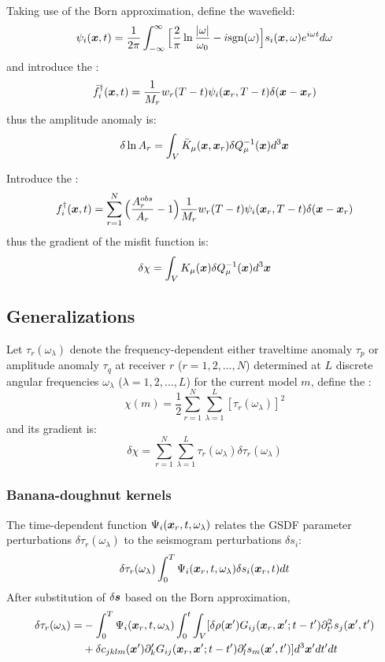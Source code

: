 Taking use of the Born approximation, define the wavefield:
\[ \psi_i(\boldsymbol{x},t)=\frac{1}{2\pi}\int_{-\infty}^\infty\Big[\frac{2}{\pi}\ln\frac{|\omega|}{\omega_0}-i\text{sgn}(\omega)\Big]s_i(\boldsymbol{x},\omega)e^{i\omega t}d\omega \]
and introduce the :
\[ \bar f_i^\dagger(\boldsymbol{x},t)=\frac{1}{M_r}w_r(T-t)\psi_i(\boldsymbol{x}_r,T-t)\delta(\boldsymbol{x}-\boldsymbol{x}_r) \]
thus the amplitude anomaly is:
\[ \delta\ln A_r=\int_V\bar K_\mu(\boldsymbol{x},\boldsymbol{x}_r)\delta Q_\mu^{-1}(\boldsymbol{x})d^3\boldsymbol{x} \]

Introduce the :
\[ f_i^\dagger(\boldsymbol{x},t)=\sum_{r=1}^N\Big(\frac{A_r^{obs}}{A_r}-1\Big)\frac{1}{M_r}w_r(T-t)\psi_i(\boldsymbol{x}_r,T-t)\delta(\boldsymbol{x}-\boldsymbol{x}_r) \]
thus the gradient of the  misfit function is:
\[ \delta\chi=\int_VK_\mu(\boldsymbol{x})\delta Q_\mu^{-1}(\boldsymbol{x})d^3\boldsymbol{x} \]

\subsection{Generalizations}
Let $\tau_r(\omega_\lambda)$ denote the frequency-dependent
either traveltime anomaly $\tau_p$ or amplitude anomaly $\tau_q$ at receiver $r$ ($r=1,2,\ldots,N$)
determined at $L$ discrete angular frequencies $\omega_\lambda$ ($\lambda=1,2,\ldots,L$)
for the current model $m$, define the :
\[ \chi(m)=\frac{1}{2}\sum_{r=1}^N\sum_{\lambda=1}^L[\tau_r(\omega_\lambda)]^2 \]
and its gradient is:
\[ \delta\chi=\sum_{r=1}^N\sum_{\lambda=1}^L\tau_r(\omega_\lambda)\delta\tau_r(\omega_\lambda) \]

\subsubsection{Banana-doughnut kernels}
The time-dependent function $\Psi_i(\boldsymbol{x}_r,t,\omega_\lambda)$
relates the GSDF parameter perturbations $\delta\tau_r(\omega_\lambda)$
to the seismogram perturbations $\delta s_i$:
\[ \delta\tau_r(\omega_\lambda)\int_0^T\Psi_i(\boldsymbol{x}_r,t,\omega_\lambda)\delta s_i(\boldsymbol{x}_r,t)dt \]
After substitution of $\delta\boldsymbol{s}$ based on the Born approximation,
\begin{align*}
  \delta\tau_r(\omega_\lambda)= & -\int_0^T\Psi_i(\boldsymbol{x}_r,t,\omega_\lambda)\int_0^t\int_V[\delta\rho(\boldsymbol{x}')G_{ij}(\boldsymbol{x}_r,\boldsymbol{x}';t-t')\partial_{t'}^2s_j(\boldsymbol{x}',t') \\
    & +\delta c_{jklm}(\boldsymbol{x}')\partial_k' G_{ij}(\boldsymbol{x}_r,\boldsymbol{x}';t-t')\partial_l' s_m(\boldsymbol{x}',t')]d^3\boldsymbol{x}'dt'dt
\end{align*}

